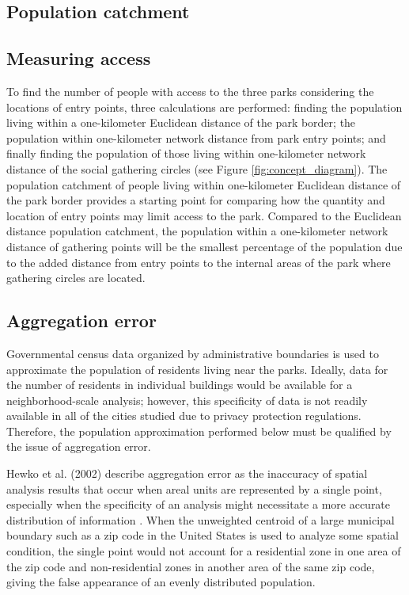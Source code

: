 \begin{multicols}{2}

\section{Population catchment}
\subsection{Measuring access}
To find the number of people with access to the three parks considering the locations of entry points, three calculations are performed: finding the population living within a one-kilometer Euclidean distance of the park border; the population within one-kilometer network distance from park entry points; and finally finding the population of those living within one-kilometer network distance of the social gathering circles (see Figure \ref{fig:concept_diagram}). The population catchment of people living within one-kilometer Euclidean distance of the park border provides a starting point for comparing how the quantity and location of entry points may limit access to the park. Compared to the Euclidean distance population catchment, the population within a one-kilometer network distance of gathering points will be the smallest percentage of the population due to the added distance from entry points to the internal areas of the park where gathering circles are located.

\subsection{Aggregation error}
Governmental census data organized by administrative boundaries is used to approximate the population of residents living near the parks. Ideally, data for the number of residents in individual buildings would be available for a neighborhood-scale analysis; however, this specificity of data is not readily available in all of the cities studied due to privacy protection regulations. Therefore, the population approximation performed below must be qualified by the issue of aggregation error. 

Hewko et al. (2002) describe aggregation error as the inaccuracy of spatial analysis results that occur when areal units are represented by a single point, especially when the specificity of an analysis might necessitate a more accurate distribution of information \cite{hewko_measuring_2002}. When the unweighted centroid of a large municipal boundary such as a zip code in the United States is used to analyze some spatial condition, the single point would not account for a residential zone in one area of the zip code and non-residential zones in another area of the same zip code, giving the false appearance of an evenly distributed population. 


\end{multicols}

